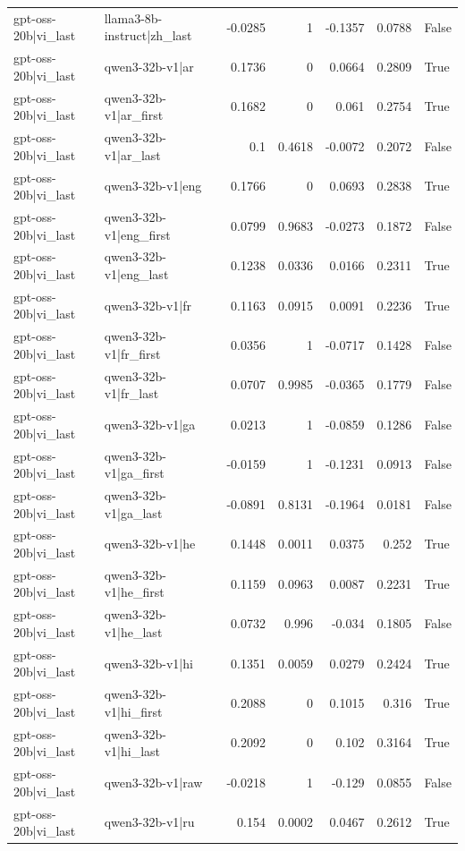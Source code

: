 \begin{table}
\begin{tabular}{l l r r r r l}
gpt-oss-20b|vi_last & llama3-8b-instruct|zh_last & -0.0285 & 1 & -0.1357 & 0.0788 & False \\
gpt-oss-20b|vi_last & qwen3-32b-v1|ar & 0.1736 & 0 & 0.0664 & 0.2809 & True \\
gpt-oss-20b|vi_last & qwen3-32b-v1|ar_first & 0.1682 & 0 & 0.061 & 0.2754 & True \\
gpt-oss-20b|vi_last & qwen3-32b-v1|ar_last & 0.1 & 0.4618 & -0.0072 & 0.2072 & False \\
gpt-oss-20b|vi_last & qwen3-32b-v1|eng & 0.1766 & 0 & 0.0693 & 0.2838 & True \\
gpt-oss-20b|vi_last & qwen3-32b-v1|eng_first & 0.0799 & 0.9683 & -0.0273 & 0.1872 & False \\
gpt-oss-20b|vi_last & qwen3-32b-v1|eng_last & 0.1238 & 0.0336 & 0.0166 & 0.2311 & True \\
gpt-oss-20b|vi_last & qwen3-32b-v1|fr & 0.1163 & 0.0915 & 0.0091 & 0.2236 & True \\
gpt-oss-20b|vi_last & qwen3-32b-v1|fr_first & 0.0356 & 1 & -0.0717 & 0.1428 & False \\
gpt-oss-20b|vi_last & qwen3-32b-v1|fr_last & 0.0707 & 0.9985 & -0.0365 & 0.1779 & False \\
gpt-oss-20b|vi_last & qwen3-32b-v1|ga & 0.0213 & 1 & -0.0859 & 0.1286 & False \\
gpt-oss-20b|vi_last & qwen3-32b-v1|ga_first & -0.0159 & 1 & -0.1231 & 0.0913 & False \\
gpt-oss-20b|vi_last & qwen3-32b-v1|ga_last & -0.0891 & 0.8131 & -0.1964 & 0.0181 & False \\
gpt-oss-20b|vi_last & qwen3-32b-v1|he & 0.1448 & 0.0011 & 0.0375 & 0.252 & True \\
gpt-oss-20b|vi_last & qwen3-32b-v1|he_first & 0.1159 & 0.0963 & 0.0087 & 0.2231 & True \\
gpt-oss-20b|vi_last & qwen3-32b-v1|he_last & 0.0732 & 0.996 & -0.034 & 0.1805 & False \\
gpt-oss-20b|vi_last & qwen3-32b-v1|hi & 0.1351 & 0.0059 & 0.0279 & 0.2424 & True \\
gpt-oss-20b|vi_last & qwen3-32b-v1|hi_first & 0.2088 & 0 & 0.1015 & 0.316 & True \\
gpt-oss-20b|vi_last & qwen3-32b-v1|hi_last & 0.2092 & 0 & 0.102 & 0.3164 & True \\
gpt-oss-20b|vi_last & qwen3-32b-v1|raw & -0.0218 & 1 & -0.129 & 0.0855 & False \\
gpt-oss-20b|vi_last & qwen3-32b-v1|ru & 0.154 & 0.0002 & 0.0467 & 0.2612 & True \\

\end{tabular}
\end{table}

